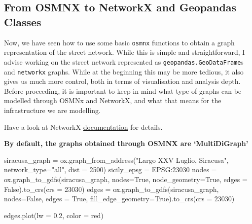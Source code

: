 \documentclass[
  letterpaper,
  DIV=11,
  numbers=noendperiod]{scrreprt}
\newenvironment{Shaded}{\begin{snugshade}}{\end{snugshade}}
\newcommand{\DecValTok}[1]{\textcolor[rgb]{0.68,0.00,0.00}{#1}}
\newcommand{\FloatTok}[1]{\textcolor[rgb]{0.68,0.00,0.00}{#1}}
\newcommand{\NormalTok}[1]{\textcolor[rgb]{0.00,0.23,0.31}{#1}}
\newcommand{\OperatorTok}[1]{\textcolor[rgb]{0.37,0.37,0.37}{#1}}
\newcommand{\StringTok}[1]{\textcolor[rgb]{0.13,0.47,0.30}{#1}}
\newcommand{\VariableTok}[1]{\textcolor[rgb]{0.07,0.07,0.07}{#1}}
\begin{document}
\subsection{From OSMNX to NetworkX and Geopandas
Classes}\label{from-osmnx-to-networkx-and-geopandas-classes}

Now, we have seen how to use some basic \texttt{osmnx} functions to
obtain a graph representation of the street network. While this is
simple and straightforward, I advise working on the street network
represented as \texttt{geopandas.GeoDataFrame}s and \texttt{networkx}
graphs. While at the beginning this may be more tedious, it also gives
us much more control, both in terms of visualisation and analysis depth.
Before proceeding, it is important to keep in mind what type of graphs
can be modelled through OSMNx and NetworkX, and what that means for the
infrastructure we are modelling.

Have a look at NetworkX
\href{https://networkx.org/documentation/stable/reference/classes/index.html}{documentation}
for details.

\textbf{By default, the graphs obtained through OSMNX are
`MultiDiGraph'}

\begin{Shaded}
\begin{Highlighting}[]
\NormalTok{siracusa\_graph }\OperatorTok{=}\NormalTok{ ox.graph\_from\_address(}\StringTok{"Largo XXV Luglio, Siracusa"}\NormalTok{, network\_type}\OperatorTok{=}\StringTok{"all"}\NormalTok{, dist }\OperatorTok{=} \DecValTok{2500}\NormalTok{)}
\NormalTok{sicily\_epsg }\OperatorTok{=} \StringTok{\textquotesingle{}EPSG:23030\textquotesingle{}}
\NormalTok{nodes }\OperatorTok{=}\NormalTok{ ox.graph\_to\_gdfs(siracusa\_graph, nodes}\OperatorTok{=}\VariableTok{True}\NormalTok{, node\_geometry}\OperatorTok{=}\VariableTok{True}\NormalTok{, edges }\OperatorTok{=} \VariableTok{False}\NormalTok{).to\_crs(crs }\OperatorTok{=} \DecValTok{23030}\NormalTok{)}
\NormalTok{edges }\OperatorTok{=}\NormalTok{ ox.graph\_to\_gdfs(siracusa\_graph, nodes}\OperatorTok{=}\VariableTok{False}\NormalTok{, edges }\OperatorTok{=}  \VariableTok{True}\NormalTok{, fill\_edge\_geometry}\OperatorTok{=}\VariableTok{True}\NormalTok{).to\_crs(crs }\OperatorTok{=} \DecValTok{23030}\NormalTok{)}
\end{Highlighting}
\end{Shaded}

\begin{Shaded}
\begin{Highlighting}[]
\NormalTok{edges.plot(lw }\OperatorTok{=} \FloatTok{0.2}\NormalTok{, color }\OperatorTok{=} \StringTok{\textquotesingle{}red\textquotesingle{}}\NormalTok{)}
\end{Highlighting}
\end{Shaded}
\end{document}
